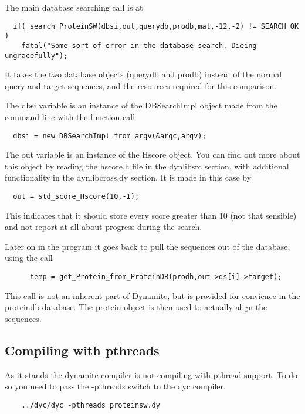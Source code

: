 The main database searching call is at

\begin{verbatim}
  if( search_ProteinSW(dbsi,out,querydb,prodb,mat,-12,-2) != SEARCH_OK ) 
    fatal("Some sort of error in the database search. Dieing ungracefully");
\end{verbatim}

It takes the two database objects (querydb and prodb) instead of the normal
query and target sequences, and the resources required for this comparison.

The dbsi variable is an instance of the DBSearchImpl object made from
the command line with the function call

\begin{verbatim}
  dbsi = new_DBSearchImpl_from_argv(&argc,argv);
\end{verbatim}

The out variable is an instance of the Hscore object. You can find out
more about this object by reading the hscore.h file in the dynlibsrc
section, with additional functionality in the dynlibcross.dy
section. It is made in this case by

\begin{verbatim}
  out = std_score_Hscore(10,-1);
\end{verbatim}

This indicates that it should store every score greater than 10 (not
that sensible) and not report at all about progress during the search.

Later on in the program it goes back to pull the sequences out of the
database, using the call

\begin{verbatim}
      temp = get_Protein_from_ProteinDB(prodb,out->ds[i]->target);
\end{verbatim}

This call is not an inherent part of Dynamite, but is provided for
convience in the proteindb database. The protein object is then used
to actually align the sequences.

\subsection{Compiling with pthreads}

As it stands the dynamite compiler is not compiling with pthread
support. To do so you need to pass the -pthreads switch to the dyc
compiler.
\begin{verbatim}
	../dyc/dyc -pthreads proteinsw.dy
\end{verbatim}

